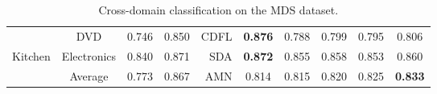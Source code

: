 \documentclass{article}
\begin{document}
\begin{table*}[t]
{\begin{tabular}{|c|c||c|c||r|c||c|c||c|c|}
                                & DVD & 0.746 & 0.850 & CDFL \citep{Yang:2015nb} & \textbf{0.876} & 0.788 & 0.799 & 0.795 & 0.806 \\
    \multirow{-3}{*}{Kitchen} & Electronics & 0.840 & 0.871 & SDA \citep{glorot2011domain} & \textbf{0.872} & 0.855 & 0.858 & 0.853 & 0.860 \\\hline\hline
                                & Average & 0.773 & 0.867 & AMN \citep{Li:2017kg} & 0.814 & 0.815 & 0.820 & \cellcolor[HTML]{C0C0C0}0.825 & \cellcolor[HTML]{C0C0C0}\textbf{0.833}\\\hline
  \end{tabular}
  }
  \caption{Cross-domain classification on the MDS dataset.}
  \label{tab:mds}
\end{table*}
\end{document}
